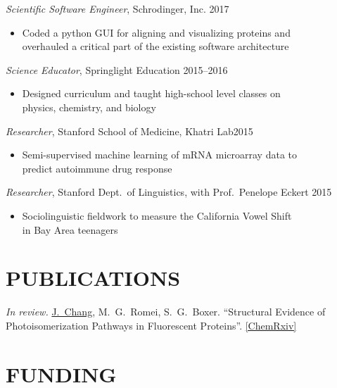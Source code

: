 \documentclass[margin, 10pt]{res}
\newenvironment{myitemize}
{ \vspace{-1.5\topsep} \begin{itemize} }
{ \end{itemize} \vspace{-1.0\topsep}}
\begin{document}
\begin{resume}
\textit{Scientific Software Engineer}, Schrodinger, Inc. \hfill 2017 \\
\begin{myitemize}
    \item Coded a python GUI for aligning and visualizing proteins and \\overhauled a critical part of the existing software architecture
\end{myitemize}

\textit{Science Educator}, Springlight Education \hfill 2015--2016\\
\begin{myitemize}
    \item Designed curriculum and taught high-school level classes on \\
        physics, chemistry, and biology
\end{myitemize}

\textit{Researcher}, Stanford School of Medicine, Khatri Lab\hfill 2015\\
\begin{myitemize}
    \item Semi-supervised machine learning of mRNA microarray data to \\predict autoimmune drug response
\end{myitemize}

\textit{Researcher}, Stanford Dept.\ of Linguistics, with Prof.\ Penelope Eckert \hfill 2015\\
\begin{myitemize}
    \item Sociolinguistic fieldwork to measure the California Vowel Shift \\in Bay Area teenagers
\end{myitemize}

\section{PUBLICATIONS}

\textit{In review.} \underline{J.\ Chang}, M.\ G.\ Romei, S.\ G.\ Boxer. ``Structural Evidence of Photoisomerization Pathways in Fluorescent Proteins''. \href{https://chemrxiv.org/articles/Structural\_Evidence\_of\_Photoisomerization\_Pathways\_in\_Fluorescent\_Proteins/9209450}{[ChemRxiv]}

\section{FUNDING}


\end{resume}
\end{document}
